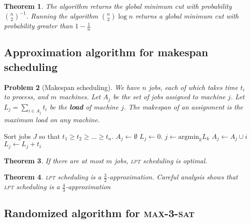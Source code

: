 \documentclass[10pt, oneside, reqno]{amsart}
\theoremstyle{plain}%
\newtheorem{thm}{Theorem}[section]
\newtheorem{prob}[thm]{Problem}
\theoremstyle{definition}
\theoremstyle{remark}
\begin{document}
\begin{thm}
	The algorithm returns the global minimum cut with probability ${n \choose 2}^{-1}$.  Running the algorithm ${n \choose 2} \log n$ returns a global minimum cut with probability greater than $1 - \frac{1}{n}$
\end{thm}


\subsection{Approximation algorithm for makespan scheduling} %
\label{sub:approximation_algorithm_for_makespan_scheduling}
\begin{prob}[Makespan scheduling]
	We have $n$ jobs, each of which takes time $t_i$ to process, and $m$ machines.  Let $A_j$ be the set of jobs assigned to machine $j$.  Let $L_j = \sum_{i \in A_j} t_i$ be the \textbf{load} of machine $j$.  The \emph{makespan} of an assignment is the maximum load on any machine.  
\end{prob}


\begin{algorithm}[H]
	\label{alg:dynamic_rising_trend}
	\caption{Longest Processing Time (\textsc{lpt}) makespan approximation}
	\begin{algorithmic}[1]
		\State Sort jobs $J$ so that $t_1 \geq t_2 \geq \dots \geq t_n$.
		\State $A_j \gets \emptyset$
		\State $L_j \gets 0$.
			\State $j \gets \text{argmin}_k L_k$
			\State $A_j \gets A_j \cup i$
			\State $L_j \gets L_j + t_i$
		\EndFor
	\EndProcedure
	\end{algorithmic}
\end{algorithm}

\begin{thm}
	If there are at most $m$ jobs, \textsc{lpt} scheduling is optimal.
\end{thm}
\begin{thm}
	\textsc{lpt} scheduling is a $\frac{3}{2}$-approximation.  Careful analysis shows that \textsc{lpt} scheduling is a $\frac{4}{3}$-approximation
\end{thm}





\subsection{Randomized algorithm for \textsc{max-3-sat}} %
\label{sub:probablistic_algorithm_for_}
\end{document}

